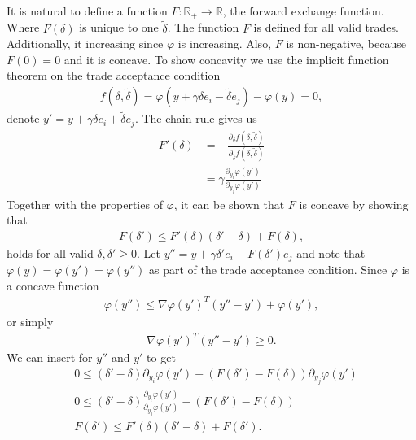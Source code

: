 It is natural to define a function $F: \mathbb{R}_+ \to \mathbb{R}$, the
forward exchange function. Where $F(\delta)$ is unique to one
$\tilde{\delta}$. The function $F$ is defined for all valid trades.
Additionally, it increasing since $\varphi$ is increasing. Also, $F$ is
non-negative, because $F(0) = 0$ and it is concave. To show concavity we use
the implicit function theorem on the trade acceptance condition
\begin{align}
f(\delta, \tilde{\delta}) = \varphi(y + \gamma\delta e_i -\tilde{\delta}e_j)
- \varphi(y) =0,
\end{align}
denote $y' = y+\gamma\delta e_i + \tilde{\delta}e_j$. The chain rule gives us
\begin{align}
    F'(\delta) &= -\frac{\partial_\delta f(\delta,
    \tilde{\delta})}{\partial_{\tilde{\delta}} f(\delta, \tilde{\delta})}\\
       &=\gamma \frac{\partial_{y_i}\varphi(y')}{\partial_{y_j}
       \varphi(y')} \label{eq: forward_implicit}
\end{align}
Together with the properties of $\varphi$, it can be shown that $F$ is
concave by showing that
\begin{align}
    F(\delta') \le F'(\delta)(\delta' - \delta) + F(\delta),
\end{align}
holds for all valid $\delta, \delta' \ge 0$. Let $y'' = y + \gamma \delta'
e_i - F(\delta') e_j$ and note that $\varphi(y) = \varphi(y') = \varphi(y'')$
as part of the trade acceptance condition. Since $\varphi$ is a concave
function
\begin{align}
    \varphi(y'') \le \nabla\varphi(y')^{T} (y'' -y')+
    \varphi(y'),\label{eq: phi_concave}
\end{align}
or simply
\begin{align}
    \nabla\varphi(y')^{T} (y'' - y') \ge 0.
\end{align}
We can insert for $y''$ and $y'$ to get
\begin{align}
    &0 \le (\delta' -\delta)\partial_{y_i} \varphi(y') - (F(\delta') -
    F(\delta))\partial_{y_j}\varphi(y') \\
    &0 \le (\delta' -\delta)\frac{\partial_{y_i} \varphi(y')}{\partial_{y_j}
    \varphi(y')} - (F(\delta') - F(\delta))\\
    & F(\delta') \le F'(\delta)(\delta' - \delta) + F(\delta').
\end{align}

